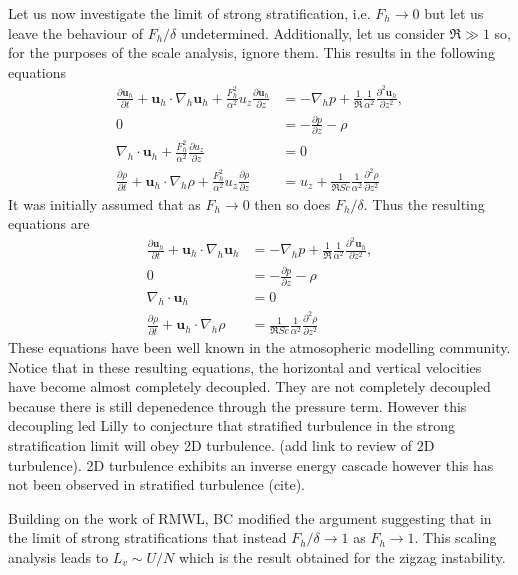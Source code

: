 Let us now investigate the limit of strong stratification, i.e. $F_{h}\rightarrow 0$ but let us leave the behaviour of $F_{h}/\delta$ undetermined. Additionally, let us consider $\Re\gg 1$ so, for the purposes of the scale analysis, ignore them. This results in the following equations 
\begin{align}
\frac{\partial \textbf{u}_{h}}{\partial t} + \textbf{u}_{h}\cdot\nabla_{h}\textbf{u}_{h}+\frac{F_{h}^{2}}{\alpha^{2}}u_{z}\frac{\partial \textbf{u}_{h}}{\partial z} &= -\nabla_{h}p + \frac{1}{\Re}\frac{1}{\alpha^{2}}\frac{\partial^{2}\textbf{u}_{h}}{\partial z^{2}},\\
0&= -\frac{\partial p}{\partial z} - \rho  \\
\nabla_{h}\cdot\textbf{u}_{h}+ \frac{F_{h}^{2}}{\alpha^{2}}\frac{\partial u_{z}}{\partial z} &=0\\
\frac{\partial \rho}{\partial t} + \textbf{u}_{h}\cdot\nabla_{h}\rho + \frac{F_{h}^{2}}{\alpha^{2}}u_{z}\frac{\partial \rho}{\partial z} &= u_{z} + \frac{1}{\Re Sc}\frac{1}{\alpha^{2}}\frac{\partial^{2}\rho}{\partial z^{2}} 
\end{align} 
It was initially assumed that as $F_{h}\rightarrow 0$ then so does $F_{h}/\delta$. Thus the resulting equations are 
\begin{align}
\frac{\partial \textbf{u}_{h}}{\partial t} + \textbf{u}_{h}\cdot\nabla_{h}\textbf{u}_{h} &= -\nabla_{h}p + \frac{1}{\Re}\frac{1}{\alpha^{2}}\frac{\partial^{2}\textbf{u}_{h}}{\partial z^{2}},\\
0&= -\frac{\partial p}{\partial z} - \rho  \\
\nabla_{h}\cdot\textbf{u}_{h} &=0\\
\frac{\partial \rho}{\partial t} + \textbf{u}_{h}\cdot\nabla_{h}\rho &= \frac{1}{\Re Sc}\frac{1}{\alpha^{2}}\frac{\partial^{2}\rho}{\partial z^{2}} 
\end{align} 
These equations have been well known in the atmosopheric modelling community. Notice that in these resulting equations, the horizontal and vertical velocities have become almost completely decoupled. They are not completely decoupled because there is still depenedence through the pressure term. However this decoupling led Lilly to conjecture that stratified turbulence in the strong stratification limit will obey 2D turbulence. (add link to review of 2D turbulence). 2D turbulence exhibits an inverse energy cascade however this has not been observed in stratified turbulence (cite).


Building on the work of RMWL, BC modified the argument suggesting that in the limit of strong stratifications that instead $F_{h}/\delta\rightarrow 1$ as $F_{h}\rightarrow 1$. This scaling analysis leads to $L_{v} \sim U/N$ which is the result obtained for the zigzag instability.

